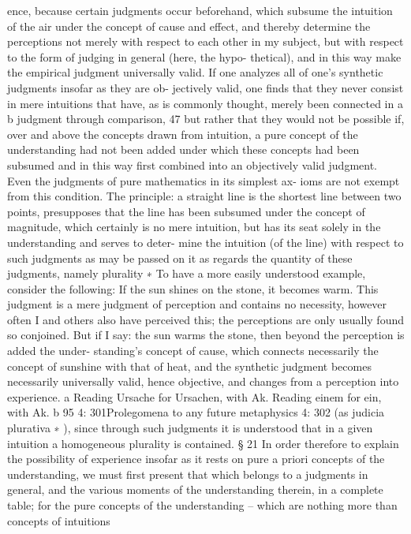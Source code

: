 ence, because certain judgments occur beforehand, which subsume the
intuition of the air under the concept of cause and effect, and thereby
determine the perceptions not merely with respect to each other in my
subject, but with respect to the form of judging in general (here, the hypo-
thetical), and in this way make the empirical judgment universally valid.
If one analyzes all of one’s synthetic judgments insofar as they are ob-
jectively valid, one ﬁnds that they never consist in mere intuitions that
have, as is commonly thought, merely been connected in a b judgment
through comparison, 47 but rather that they would not be possible if,
over and above the concepts drawn from intuition, a pure concept of
the understanding had not been added under which these concepts had
been subsumed and in this way ﬁrst combined into an objectively valid
judgment. Even the judgments of pure mathematics in its simplest ax-
ioms are not exempt from this condition. The principle: a straight line is
the shortest line between two points, presupposes that the line has been
subsumed under the concept of magnitude, which certainly is no mere
intuition, but has its seat solely in the understanding and serves to deter-
mine the intuition (of the line) with respect to such judgments as may be
passed on it as regards the quantity of these judgments, namely plurality
∗ To have a more easily understood example, consider the following: If the sun
shines on the stone, it becomes warm. This judgment is a mere judgment of
perception and contains no necessity, however often I and others also have
perceived this; the perceptions are only usually found so conjoined. But if I
say: the sun warms the stone, then beyond the perception is added the under-
standing’s concept of cause, which connects necessarily the concept of sunshine
with that of heat, and the synthetic judgment becomes necessarily universally
valid, hence objective, and changes from a perception into experience.
a Reading Ursache for Ursachen, with Ak.
Reading einem for ein, with Ak.
b
95
4: 301Prolegomena to any future metaphysics
4: 302
(as judicia plurativa ∗ ), since through such judgments it is understood that
in a given intuition a homogeneous plurality is contained.
§ 21
In order therefore to explain the possibility of experience insofar as it
rests on pure a priori concepts of the understanding, we must ﬁrst present
that which belongs to a judgments in general, and the various moments of
the understanding therein, in a complete table; for the pure concepts of
the understanding – which are nothing more than concepts of intuitions
